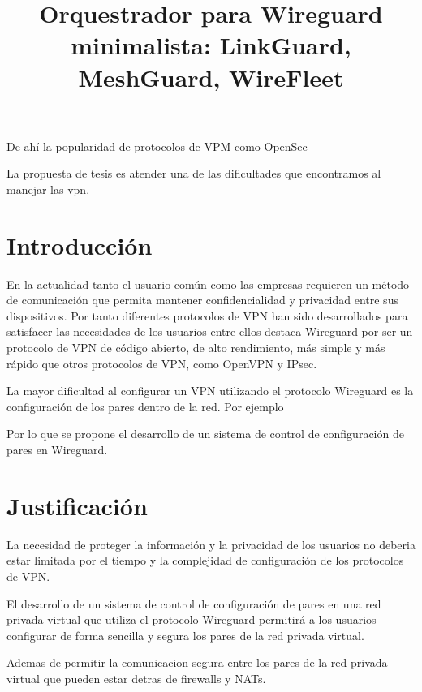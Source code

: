 \documentclass{article}
\title{Orquestrador para Wireguard minimalista: LinkGuard, MeshGuard, WireFleet}
\begin{document}
\maketitle



De ahí la popularidad de protocolos de VPM como OpenSec

La propuesta de tesis es atender una de las dificultades que encontramos al manejar las vpn.




\section{Introducción}

En la actualidad tanto el usuario común como las empresas requieren un método de comunicación que permita mantener confidencialidad y privacidad entre sus dispositivos. Por tanto diferentes protocolos de VPN han sido desarrollados para satisfacer las necesidades de los usuarios entre ellos destaca Wireguard por ser un protocolo de VPN de código abierto, de alto rendimiento, más simple y más rápido que otros protocolos de VPN, como OpenVPN y IPsec.


La mayor dificultad al configurar un VPN utilizando el protocolo Wireguard es la configuración de los pares dentro de la red. Por ejemplo 

Por lo que se propone el desarrollo de un sistema de control de configuración de pares en Wireguard.

\section{Justificación}
    
La necesidad de proteger la información y la privacidad de los usuarios no deberia estar limitada por el tiempo y la complejidad de configuración de los protocolos de VPN. 



El desarrollo de un sistema de control de configuración de pares en una red privada virtual que utiliza el protocolo Wireguard permitirá a los usuarios configurar de forma sencilla y segura los pares de la red privada virtual.

Ademas de permitir la comunicacion segura entre los pares de la red privada virtual que pueden estar detras de firewalls y NATs.
\end{document}
